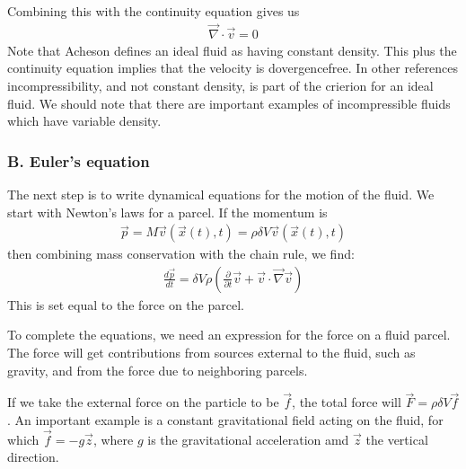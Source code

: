\documentclass[letterpaper,10pt,english]{jupyterBook}
\begin{document}
\sphinxAtStartPar
Combining this with the continuity equation gives us
\begin{equation}\label{equation:chapter1/euler:nodiv}
\begin{split}{\vec \nabla}\cdot {\vec v} = 0\end{split}
\end{equation}
\sphinxAtStartPar
Note that Acheson defines an ideal fluid as having constant
density. This plus the continuity equation implies that the velocity is
dovergence\sphinxhyphen{}free. In other references incompressibility, and not
constant density, is part of the crierion for an ideal fluid. We
should note that there are important examples
of incompressible fluids which have variable density.


\subsubsection{B. Euler’s equation}
\label{\detokenize{chapter1/euler:b-euler-s-equation}}
\sphinxAtStartPar
The next step is to write dynamical equations for the motion of the fluid.
We start with Newton’s laws for a parcel. If the momentum is
\begin{equation*}
\begin{split}{\vec p} = M {\vec v}({\vec x}(t), t) = \rho \delta V {\vec v}({\vec x}(t), t)\end{split}
\end{equation*}
\sphinxAtStartPar
then combining mass conservation with the chain rule, we find:
\begin{equation*}
\begin{split}\frac{d {\vec p}}{dt} = \delta V \rho \left(\frac{\partial}{\partial t}
{\vec v} + {\vec v}\cdot {\vec \nabla} {\vec v}\right) \end{split}
\end{equation*}
\sphinxAtStartPar
This is set equal to the force on the parcel.

\sphinxAtStartPar
To complete the equations, we need an expression for the force
on a fluid parcel.  The force will get contributions from sources
external to the fluid, such as gravity, and from the force due to
neighboring parcels.

\sphinxAtStartPar
If we take the external force  on the particle to
be \({\vec f}\), the total force will \({\vec F} = \rho \delta V {\vec f}\).
An important example is a constant gravitational field acting on
the fluid, for which \({\vec f} = - g {\vec z}\), where \(g\) is the gravitational
acceleration amd \({\vec z}\) the vertical direction.
\end{document}
